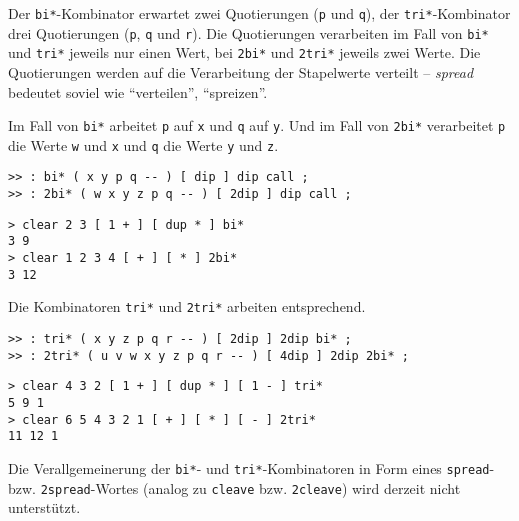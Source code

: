 Der \verb|bi*|-Kombinator erwartet zwei Quotierungen (\verb|p| und \verb|q|), der \verb|tri*|-Kombinator drei Quotierungen (\verb|p|, \verb|q| und \verb|r|). Die Quotierungen verarbeiten im Fall von \verb|bi*| und \verb|tri*| jeweils nur einen Wert, bei \verb|2bi*| und \verb|2tri*| jeweils zwei Werte. Die Quotierungen werden auf die Verarbeitung der Stapelwerte verteilt -- \emph{spread} bedeutet soviel wie "`verteilen"', "`spreizen"'.

Im Fall von \verb|bi*| arbeitet \verb|p| auf \verb|x| und \verb|q| auf \verb|y|. Und im Fall von \verb|2bi*| verarbeitet \verb|p| die Werte \verb|w| und \verb|x| und \verb|q| die Werte \verb|y| und \verb|z|.

\begin{verbatim}
>> : bi* ( x y p q -- ) [ dip ] dip call ;
>> : 2bi* ( w x y z p q -- ) [ 2dip ] dip call ;
\end{verbatim}

\begin{verbatim}
> clear 2 3 [ 1 + ] [ dup * ] bi*
3 9
> clear 1 2 3 4 [ + ] [ * ] 2bi*
3 12
\end{verbatim}

Die Kombinatoren \verb|tri*| und \verb|2tri*| arbeiten entsprechend.

\begin{verbatim}
>> : tri* ( x y z p q r -- ) [ 2dip ] 2dip bi* ;
>> : 2tri* ( u v w x y z p q r -- ) [ 4dip ] 2dip 2bi* ;
\end{verbatim}

\begin{verbatim}
> clear 4 3 2 [ 1 + ] [ dup * ] [ 1 - ] tri*
5 9 1
> clear 6 5 4 3 2 1 [ + ] [ * ] [ - ] 2tri*
11 12 1
\end{verbatim}

Die Verallgemeinerung der \verb|bi*|- und \verb|tri*|-Kombinatoren in Form eines \verb|spread|- bzw. \verb|2spread|-Wortes (analog zu \verb|cleave| bzw. \verb|2cleave|) wird derzeit nicht unterstützt.



